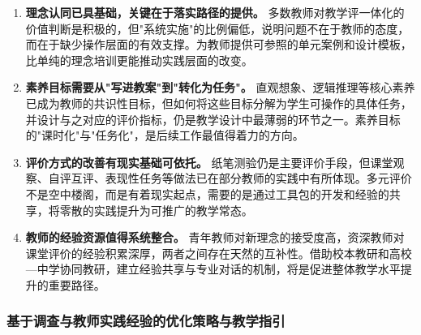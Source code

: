 \documentclass[UTF8,a4paper,12pt,twoside]{ctexart}
\begin{document}
\begin{enumerate}
    \item \textbf{理念认同已具基础，关键在于落实路径的提供。}
    多数教师对教学评一体化的价值判断是积极的，但"系统实施"的比例偏低，说明问题不在于教师的态度，而在于缺少操作层面的有效支撑。为教师提供可参照的单元案例和设计模板，比单纯的理念培训更能推动实践层面的改变。

    \item \textbf{素养目标需要从"写进教案"到"转化为任务"。}
    直观想象、逻辑推理等核心素养已成为教师的共识性目标，但如何将这些目标分解为学生可操作的具体任务，并设计与之对应的评价指标，仍是教学设计中最薄弱的环节之一。素养目标的"课时化"与"任务化"，是后续工作最值得着力的方向。

    \item \textbf{评价方式的改善有现实基础可依托。}
    纸笔测验仍是主要评价手段，但课堂观察、自评互评、表现性任务等做法已在部分教师的实践中有所体现。多元评价不是空中楼阁，而是有着现实起点，需要的是通过工具包的开发和经验的共享，将零散的实践提升为可推广的教学常态。

    \item \textbf{教师的经验资源值得系统整合。}
    青年教师对新理念的接受度高，资深教师对课堂评价的经验积累深厚，两者之间存在天然的互补性。借助校本教研和高校—中学协同教研，建立经验共享与专业对话的机制，将是促进整体教学水平提升的重要路径。
\end{enumerate}

\subsubsection{基于调查与教师实践经验的优化策略与教学指引}
\end{document}
